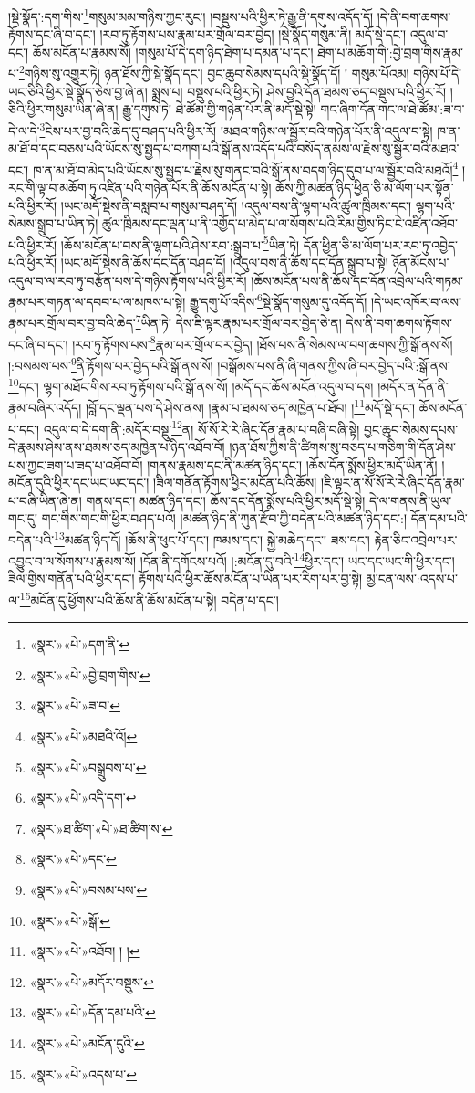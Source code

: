 །སྡེ་སྣོད་:དག་གིས་\footnote{«སྣར་»«པེ་»དག་ནི་}གསུམ་མམ་གཉིས་ཀྱང་རུང་། །བསྡུས་པའི་ཕྱིར་ཏེ་རྒྱུ་ནི་དགུས་འདོད་དོ། །དེ་ནི་བག་ཆགས་རྟོགས་དང་ཞི་བ་དང་། །རབ་ཏུ་རྟོགས་པས་རྣམ་པར་གྲོལ་བར་བྱེད། །སྡེ་སྣོད་གསུམ་ནི། མདོ་སྡེ་དང་། འདུལ་བ་དང་། ཆོས་མངོན་པ་རྣམས་སོ། །གསུམ་པོ་དེ་དག་ཉིད་ཐེག་པ་དམན་པ་དང་། ཐེག་པ་མཆོག་གི་:བྱེ་བྲག་གིས་རྣམ་པ་\footnote{«སྣར་»«པེ་»བྱེ་བྲག་གིས་}གཉིས་སུ་འགྱུར་ཏེ། ཉན་ཐོས་ཀྱི་སྡེ་སྣོད་དང་། བྱང་ཆུབ་སེམས་དཔའི་སྡེ་སྣོད་དོ། །
གསུམ་པོའམ། གཉིས་པོ་དེ་ཡང་ཅིའི་ཕྱིར་སྡེ་སྣོད་ཅེས་བྱ་ཞེ་ན། སྨྲས་པ། བསྡུས་པའི་ཕྱིར་ཏེ། ཤེས་བྱའི་དོན་ཐམས་ཅད་བསྡུས་པའི་ཕྱིར་རོ། །ཅིའི་ཕྱིར་གསུམ་ཡིན་ཞེ་ན། རྒྱུ་དགུས་ཏེ། ཐེ་ཚོམ་གྱི་གཉེན་པོར་ནི་མདོ་སྡེ་སྟེ། གང་ཞིག་དོན་གང་ལ་ཐེ་ཚོམ་:ཟ་བ་དེ་ལ་དེ་\footnote{«སྣར་»«པེ་»ཟ་བ་}ངེས་པར་བྱ་བའི་ཆེད་དུ་བཤད་པའི་ཕྱིར་རོ། །མཐའ་གཉིས་ལ་སྦྱོར་བའི་གཉེན་པོར་ནི་འདུལ་བ་སྟེ། ཁ་ན་མ་ཐོ་བ་དང་བཅས་པའི་ཡོངས་སུ་སྤྱད་པ་བཀག་པའི་སྒོ་ནས་འདོད་པའི་བསོད་ནམས་ལ་རྗེས་སུ་སྦྱོར་བའི་མཐའ་དང་། ཁ་ན་མ་ཐོ་བ་མེད་པའི་ཡོངས་སུ་སྤྱད་པ་རྗེས་སུ་གནང་བའི་སྒོ་ནས་བདག་ཉིད་དུབ་པ་ལ་སྦྱོར་བའི་མཐའོ།\footnote{«སྣར་»«པེ་»མཐའི་འོ།} །རང་གི་ལྟ་བ་མཆོག་ཏུ་འཛིན་པའི་གཉེན་པོར་ནི་ཆོས་མངོན་པ་སྟེ། ཆོས་ཀྱི་མཚན་ཉིད་ཕྱིན་ཅི་མ་ལོག་པར་སྟོན་པའི་ཕྱིར་རོ། །ཡང་མདོ་སྡེས་ནི་བསླབ་པ་གསུམ་བཤད་དོ། །འདུལ་བས་ནི་ལྷག་པའི་ཚུལ་ཁྲིམས་དང་། ལྷག་པའི་སེམས་སྒྲུབ་པ་ཡིན་ཏེ། ཚུལ་ཁྲིམས་དང་ལྡན་པ་ནི་འགྱོད་པ་མེད་པ་ལ་སོགས་པའི་རིམ་གྱིས་ཏིང་ངེ་འཛིན་འཐོབ་པའི་ཕྱིར་རོ། །ཆོས་མངོན་པ་བས་ནི་ལྷག་པའི་ཤེས་རབ་:སྒྲུབ་པ་\footnote{«སྣར་»«པེ་»བསྒྲུབས་པ་}ཡིན་ཏེ། དོན་ཕྱིན་ཅི་མ་ལོག་པར་རབ་ཏུ་འབྱེད་པའི་ཕྱིར་རོ། །ཡང་མདོ་སྡེས་ནི་ཆོས་དང་དོན་བཤད་དོ། །འདུལ་བས་ནི་ཆོས་དང་དོན་སྒྲུབ་པ་སྟེ། ཉོན་མོངས་པ་འདུལ་བ་ལ་རབ་ཏུ་བརྩོན་པས་དེ་གཉིས་རྟོགས་པའི་ཕྱིར་རོ། །ཆོས་མངོན་པས་ནི་ཆོས་དང་དོན་འབྲེལ་པའི་གཏམ་རྣམ་པར་གཏན་ལ་དབབ་པ་ལ་མཁས་པ་སྟེ། རྒྱུ་དགུ་པོ་འདིས་\footnote{«སྣར་»«པེ་»འདི་དག་}སྡེ་སྣོད་གསུམ་དུ་འདོད་དོ། །དེ་ཡང་འཁོར་བ་ལས་རྣམ་པར་གྲོལ་བར་བྱ་བའི་ཆེད་\footnote{«སྣར་»ཐ་ཚིག་«པེ་»ཐ་ཚིག་ས་}ཡིན་ཏེ། དེས་ཇི་ལྟར་རྣམ་པར་གྲོལ་བར་བྱེད་ཅེ་ན། དེས་ནི་བག་ཆགས་རྟོགས་དང་ཞི་བ་དང་། །རབ་ཏུ་རྟོགས་པས་\footnote{«སྣར་»«པེ་»དང་}རྣམ་པར་གྲོལ་བར་བྱེད། །ཐོས་པས་ནི་སེམས་ལ་བག་ཆགས་ཀྱི་སྒོ་ནས་སོ། །:བསམས་པས་\footnote{«སྣར་»«པེ་»བསམ་པས་}ནི་རྟོགས་པར་བྱེད་པའི་སྒོ་ནས་སོ། །བསྒོམས་པས་ནི་ཞི་གནས་ཀྱིས་ཞི་བར་བྱེད་པའི་:སྒོ་ནས་\footnote{«སྣར་»«པེ་»སྒོ་}དང་། ལྷག་མཐོང་གིས་རབ་ཏུ་རྟོགས་པའི་སྒོ་ནས་སོ། །མདོ་དང་ཆོས་མངོན་འདུལ་བ་དག །མདོར་ན་དོན་ནི་རྣམ་བཞིར་འདོད། །བློ་དང་ལྡན་པས་དེ་ཤེས་ནས། །རྣམ་པ་ཐམས་ཅད་མཁྱེན་པ་ཐོབ། །\footnote{«སྣར་»«པེ་»འཐོབ། ། །}མདོ་སྡེ་དང་། ཆོས་མངོན་པ་དང་། འདུལ་བ་དེ་དག་ནི་:མདོར་བསྡུ་\footnote{«སྣར་»«པེ་»མདོར་བསྡུས་}ན། སོ་སོ་རེ་རེ་ཞིང་དོན་རྣམ་པ་བཞི་བཞི་སྟེ། བྱང་ཆུབ་སེམས་དཔས་དེ་རྣམས་ཤེས་ནས་ཐམས་ཅད་མཁྱེན་པ་ཉིད་འཐོབ་བོ། །ཉན་ཐོས་ཀྱིས་ནི་ཚིགས་སུ་བཅད་པ་གཅིག་གི་དོན་ཤེས་པས་ཀྱང་ཟག་པ་ཟད་པ་འཐོབ་བོ། །གནས་རྣམས་དང་ནི་མཚན་ཉིད་དང་། །ཆོས་དོན་སྨོས་ཕྱིར་མདོ་ཡིན་ནོ། །མངོན་དུའི་ཕྱིར་དང་ཡང་ཡང་དང་། །ཟིལ་གནོན་རྟོགས་ཕྱིར་མངོན་པའི་ཆོས། །ཇི་ལྟར་ན་སོ་སོ་རེ་རེ་ཞིང་དོན་རྣམ་པ་བཞི་ཡིན་ཞེ་ན། གནས་དང་། མཚན་ཉིད་དང་། ཆོས་དང་དོན་སྨོས་པའི་ཕྱིར་མདོ་སྡེ་སྟེ། དེ་ལ་གནས་ནི་ཡུལ་གང་དུ། གང་གིས་གང་གི་ཕྱིར་བཤད་པའོ། །མཚན་ཉིད་ནི་ཀུན་རྫོབ་ཀྱི་བདེན་པའི་མཚན་ཉིད་དང་:། དོན་དམ་པའི་བདེན་པའི་\footnote{«སྣར་»«པེ་»དོན་དམ་པའི་}མཚན་ཉིད་དོ། །ཆོས་ནི་ཕུང་པོ་དང་། ཁམས་དང་། སྐྱེ་མཆེད་དང་། ཟས་དང་། རྟེན་ཅིང་འབྲེལ་པར་འབྱུང་བ་ལ་སོགས་པ་རྣམས་སོ། །དོན་ནི་དགོངས་པའོ། །:མངོན་དུ་བའི་\footnote{«སྣར་»«པེ་»མངོན་དུའི་}ཕྱིར་དང་། ཡང་དང་ཡང་གི་ཕྱིར་དང་། ཟིལ་གྱིས་གནོན་པའི་ཕྱིར་དང་། རྟོགས་པའི་ཕྱིར་ཆོས་མངོན་པ་ཡིན་པར་རིག་པར་བྱ་སྟེ། མྱ་ངན་ལས་:འདས་པ་ལ་\footnote{«སྣར་»«པེ་»འདས་པ་}མངོན་དུ་ཕྱོགས་པའི་ཆོས་ནི་ཆོས་མངོན་པ་སྟེ། བདེན་པ་དང་། 